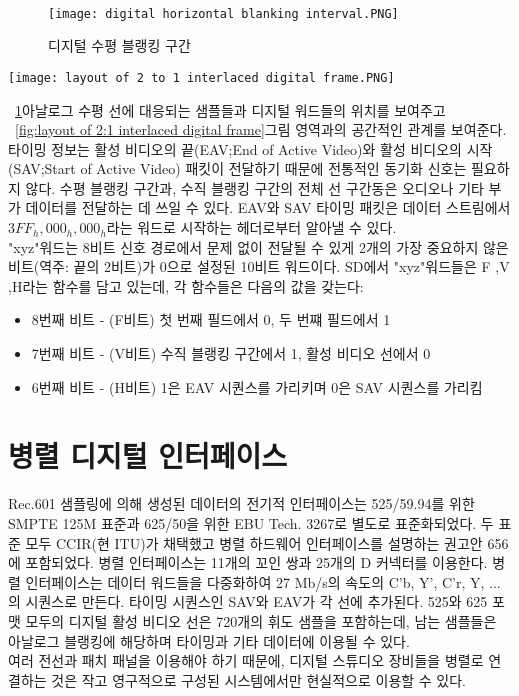 \\
\begin{figure}[!htp]
    \centering
    \texttt{[image: digital horizontal blanking interval.PNG]}
    \caption{디지털 수평 블랭킹 구간}\label{fig:digital horizontal blanking interval}
\end{figure}
\begin{figure*}[tpb]
    \centering
    \texttt{[image: layout of 2 to 1 interlaced digital frame.PNG]}
    \caption{2:1 비월 주사 디지털 프레임의 구조}\label{fig:layout of 2:1 interlaced digital frame}
\end{figure*}
\figurename~\ref{fig:digital horizontal blanking interval}\은 아날로그 수평 선에 대응되는 샘플들과 디지털 워드들의 위치를 보여주고 \figurename~\ref{fig:layout of 2:1 interlaced digital frame}\은 그림 영역과의 공간적인 관계를 보여준다.
타이밍 정보는 활성 비디오의 끝(EAV;End of Active Video)와 활성 비디오의 시작(SAV;Start of Active Video) 패킷이 전달하기 때문에 전통적인 동기화 신호는 필요하지 않다.
수평 블랭킹 구간과, 수직 블랭킹 구간의 전체 선 구간동은 오디오나 기타 부가 데이터를 전달하는 데 쓰일 수 있다. EAV와 SAV 타이밍 패킷은 데이터 스트림에서 $3FF_h, 000_h, 000_h$라는 워드로 시작하는 헤더로부터 알아낼 수 있다.
\\
"xyz"워드는 8비트 신호 경로에서 문제 없이 전달될 수 있게 2개의 가장 중요하지 않은 비트(역주: 끝의 2비트)가 0으로 설정된 10비트 워드이다.
SD에서 "xyz"워드들은 F ,V ,H라는 함수를 담고 있는데, 각 함수들은 다음의 값을 갖는다:
\begin{itemize}
    \item 8번째 비트 - (F비트) 첫 번째 필드에서 0, 두 번쨰 필드에서 1
    \item 7번째 비트 - (V비트) 수직 블랭킹 구간에서 1, 활성 비디오 선에서 0
    \item 6번째 비트 - (H비트) 1은 EAV 시퀀스를 가리키며 0은 SAV 시퀀스를 가리킴
\end{itemize}

\section{병렬 디지털 인터페이스}
Rec.601 샘플링에 의해 생성된 데이터의 전기적 인터페이스는 525/59.94를 위한 SMPTE 125M 표준과 625/50을 위한 EBU Tech. 3267로 별도로 표준화되었다. 두 표준 모두 CCIR(현 ITU)가 채택했고 병렬 하드웨어 인터페이스를 설명하는 권고안 656에 포함되었다.
병렬 인터페이스는 11개의 꼬인 쌍과 25개의 D 커넥터를 이용한다. 병렬 인터페이스는 데이터 워드들을 다중화하여 27 Mb/s의 속도의 C'b, Y', C'r, Y, ...의 시퀀스로 만든다. 타이밍 시퀀스인 SAV와 EAV가 각 선에 추가된다.
525와 625 포맷 모두의 디지털 활성 비디오 선은 720개의 휘도 샘플을 포함하는데, 남는 샘플들은 아날로그 블랭킹에 해당하며 타이밍과 기타 데이터에 이용될 수 있다.
\\
여러 전선과 패치 패널을 이용해야 하기 때문에, 디지털 스튜디오 장비들을 병렬로 연결하는 것은 작고 영구적으로 구성된 시스템에서만 현실적으로 이용할 수 있다.

